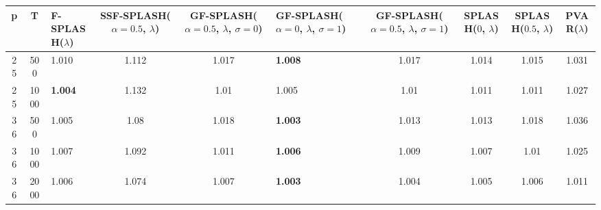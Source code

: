 \begin{tabular}{cclcclcccc}
\hline
  p  &  T   & F-SPLASH($\lambda$)   &  SSF-SPLASH($\alpha=0.5$, $\lambda$)  &  GF-SPLASH($\alpha=0.5$, $\lambda$, $\sigma=0$)  & GF-SPLASH($\alpha=0$, $\lambda$, $\sigma=1$)   &  GF-SPLASH($\alpha=0.5$, $\lambda$, $\sigma=1$)  &  SPLASH($0$, $\lambda$)  &  SPLASH($0.5$, $\lambda$)  &  PVAR($\lambda$)  \\
\hline
 25  & 500  & 1.010                 &                 1.112                 &                      1.017                       & \textbf{1.008}                                 &                      1.017                       &          1.014           &           1.015            &       1.031       \\
 25  & 1000 & \textbf{1.004}        &                 1.132                 &                       1.01                       & 1.005                                          &                       1.01                       &          1.011           &           1.011            &       1.027       \\
 36  & 500  & 1.005                 &                 1.08                  &                      1.018                       & \textbf{1.003}                                 &                      1.013                       &          1.013           &           1.018            &       1.036       \\
 36  & 1000 & 1.007                 &                 1.092                 &                      1.011                       & \textbf{1.006}                                 &                      1.009                       &          1.007           &            1.01            &       1.025       \\
 36  & 2000 & 1.006                 &                 1.074                 &                      1.007                       & \textbf{1.003}                                 &                      1.004                       &          1.005           &           1.006            &       1.011       \\
\hline
\end{tabular}